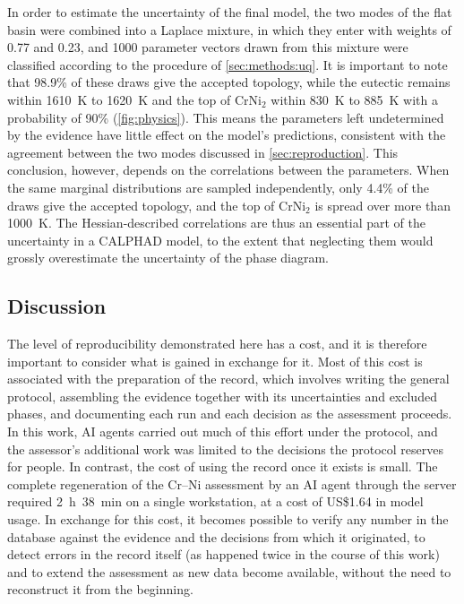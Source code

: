 In order to estimate the uncertainty of the final model, the two modes of the flat basin were combined into a Laplace mixture, in which they enter with weights of 0.77 and 0.23, and 1000 parameter vectors drawn from this mixture were classified according to the procedure of \cref{sec:methods:uq}. It is important to note that 98.9\% of these draws give the accepted topology, while the eutectic remains within \qty{1610}{\K} to \qty{1620}{\K} and the top of CrNi$_2$ within \qty{830}{\K} to \qty{885}{\K} with a probability of 90\% (\cref{fig:physics}). This means the parameters left undetermined by the evidence have little effect on the model's predictions, consistent with the agreement between the two modes discussed in \cref{sec:reproduction}. This conclusion, however, depends on the correlations between the parameters. When the same marginal distributions are sampled independently, only 4.4\% of the draws give the accepted topology, and the top of CrNi$_2$ is spread over more than \qty{1000}{\K}. The Hessian-described correlations are thus an essential part of the uncertainty in a CALPHAD model, to the extent that neglecting them would grossly overestimate the uncertainty of the phase diagram.

\subsection{Discussion}
\label{sec:discussion}

The level of reproducibility demonstrated here has a cost, and it is therefore important to consider what is gained in exchange for it. Most of this cost is associated with the preparation of the record, which involves writing the general protocol, assembling the evidence together with its uncertainties and excluded phases, and documenting each run and each decision as the assessment proceeds. In this work, AI agents carried out much of this effort under the protocol, and the assessor's additional work was limited to the decisions the protocol reserves for people. In contrast, the cost of using the record once it exists is small. The complete regeneration of the Cr--Ni assessment by an AI agent through the server required 2~h~38~min on a single workstation, at a cost of US\$1.64 in model usage. In exchange for this cost, it becomes possible to verify any number in the database against the evidence and the decisions from which it originated, to detect errors in the record itself (as happened twice in the course of this work) and to extend the assessment as new data become available, without the need to reconstruct it from the beginning.

